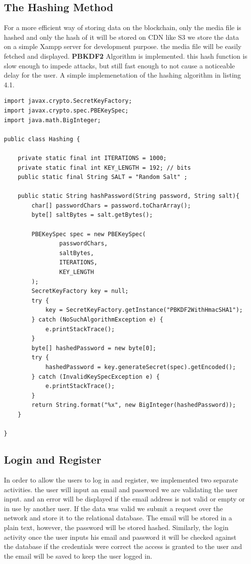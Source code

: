 \subsection{The Hashing Method}
For a more efficient way of storing data on the blockchain, only the media file is hashed and only the hash of it will be stored on CDN like S3 we store the data on a simple Xampp server for development purpose. the media file will be easily fetched and displayed. 
\textbf{PBKDF2} Algorithm is implemented. this hash function is slow enough to impede attacks, but still fast enough to not cause a noticeable delay for the user. A simple implemenetation of the hashing algorithm in listing 4.1.

 \begin{lstlisting}[caption={PBKDF2 Simple Implementation},captionpos=b]
import javax.crypto.SecretKeyFactory;
import javax.crypto.spec.PBEKeySpec;
import java.math.BigInteger;

public class Hashing {

    private static final int ITERATIONS = 1000;
    private static final int KEY_LENGTH = 192; // bits
    public static final String SALT = "Random Salt" ;

    public static String hashPassword(String password, String salt){
        char[] passwordChars = password.toCharArray();
        byte[] saltBytes = salt.getBytes();

        PBEKeySpec spec = new PBEKeySpec(
                passwordChars,
                saltBytes,
                ITERATIONS,
                KEY_LENGTH
        );
        SecretKeyFactory key = null;
        try {
            key = SecretKeyFactory.getInstance("PBKDF2WithHmacSHA1");
        } catch (NoSuchAlgorithmException e) {
            e.printStackTrace();
        }
        byte[] hashedPassword = new byte[0];
        try {
            hashedPassword = key.generateSecret(spec).getEncoded();
        } catch (InvalidKeySpecException e) {
            e.printStackTrace();
        }
        return String.format("%x", new BigInteger(hashedPassword));
    }

}
\end{lstlisting}
\cleardoublepage

\subsection{Login and Register}
In order to allow the users to log in and register, we implemented two separate activities. the user will input an email and password we are validating the user input. and an error will be displayed if the email address is not valid or empty or in use by another user. 
If the data was valid we submit a request over the network and store it to the relational database. The email will be stored in a plain text, however, the password will be stored hashed. 
Similarly, the login activity once the user inputs his email and password it will be checked against the database if the credentials were correct the access is granted to the user and the email will be saved to keep the user logged in.


